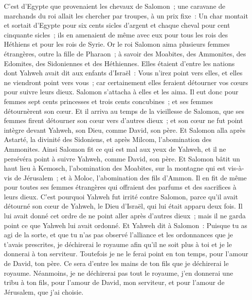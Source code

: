 \begin{multicols}{2}
C'est d'Egypte que provenaient les chevaux de Salomon~; une caravane de marchands du roi allait les chercher par troupes, à un prix fixe~:
Un char montait et sortait d'Egypte pour six cents sicles d'argent et chaque cheval pour cent cinquante sicles~; ils en amenaient de même avec eux pour tous les rois des Héthiens et pour les rois de Syrie.
\VerseOne{}Or le roi Salomon aima plusieurs femmes étrangères, outre la fille de Pharaon~; à savoir des Moabites, des Ammonites, des Edomites, des Sidoniennes et des Héthiennes.
Elles étaient d'entre les nations dont Yahweh avait dit aux enfants d'Israël~: Vous n'irez point vers elles, et elles ne viendront point vers vous~; car certainement elles feraient détourner vos cœurs pour suivre leurs dieux. Salomon s'attacha à elles et les aima.
Il eut donc pour femmes sept cents princesses et trois cents concubines~; et ses femmes détournèrent son cœur.
Et il arriva au temps de la vieillesse de Salomon, que ses femmes firent détourner son cœur vers d'autres dieux~; et son cœur ne fut point intègre devant Yahweh, son Dieu, comme David, son père.
Et Salomon alla après Astarté, la divinité des Sidoniens, et après Milcom, l'abomination des Ammonites.
Ainsi Salomon fit ce qui est mal aux yeux de Yahweh, et il ne persévéra point à suivre Yahweh, comme David, son père.
Et Salomon bâtit un haut lieu à Kemosch, l'abomination des Moabites, sur la montagne qui est vis-à-vis de Jérusalem~; et à Moloc, l'abomination des fils d'Ammon.
Il en fit de même pour toutes ses femmes étrangères qui offraient des parfums et des sacrifices à leurs dieux.
C'est pourquoi Yahweh fut irrité contre Salomon, parce qu'il avait détourné son cœur de Yahweh, le Dieu d'Israël, qui lui était apparu deux fois.
Il lui avait donné cet ordre de ne point aller après d'autres dieux~; mais il ne garda point ce que Yahweh lui avait ordonné.
Et Yahweh dit à Salomon~: Puisque tu as agi de la sorte, et que tu n'as pas observé l'alliance et les ordonnances que je t'avais prescrites, je déchirerai le royaume afin qu'il ne soit plus à toi et je le donnerai à ton serviteur.
Toutefois je ne le ferai point en ton temps, pour l'amour de David, ton père. Ce sera d'entre les mains de ton fils que je déchirerai le royaume.
Néanmoins, je ne déchirerai pas tout le royaume, j'en donnerai une tribu à ton fils, pour l'amour de David, mon serviteur, et pour l'amour de Jérusalem, que j'ai choisie.

\end{multicols}
